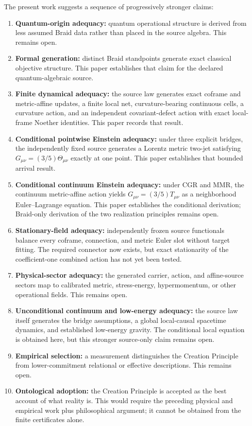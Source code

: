 \documentclass[11pt]{article}
\theoremstyle{definition}
\theoremstyle{remark}
\begin{document}
The present work suggests a sequence of progressively stronger claims:
\begin{enumerate}
\item \textbf{Quantum-origin adequacy:} quantum operational structure is derived from less assumed Braid data rather than placed in the source algebra. This remains open.
\item \textbf{Formal generation:} distinct Braid standpoints generate exact classical objective structure. This paper establishes that claim for the declared quantum-algebraic source.
\item \textbf{Finite dynamical adequacy:} the source law generates exact coframe and metric-affine updates, a finite local net, curvature-bearing continuous cells, a curvature action, and an independent covariant-defect action with exact local-frame Noether identities. This paper records that result.
\item \textbf{Conditional pointwise Einstein adequacy:} under three explicit bridges, the independently fixed source generates a Lorentz metric two-jet satisfying $G_{\mu\nu}=(3/5)\Theta_{\mu\nu}$ exactly at one point. This paper establishes that bounded arrival result.
\item \textbf{Conditional continuum Einstein adequacy:} under CGR and MMR, the continuum metric-affine action yields $G_{\mu\nu}=(3/5)T_{\mu\nu}$ as a neighborhood Euler--Lagrange equation. This paper establishes the conditional derivation; Braid-only derivation of the two realization principles remains open.
\item \textbf{Stationary-field adequacy:} independently frozen source functionals balance every coframe, connection, and metric Euler slot without target fitting. The required connector now exists, but exact stationarity of the coefficient-one combined action has not yet been tested.
\item \textbf{Physical-sector adequacy:} the generated carrier, action, and affine-source sectors map to calibrated metric, stress-energy, hypermomentum, or other operational fields. This remains open.
\item \textbf{Unconditional continuum and low-energy adequacy:} the source law itself generates the bridge assumptions, a global local-causal spacetime dynamics, and established low-energy gravity. The conditional local equation is obtained here, but this stronger source-only claim remains open.
\item \textbf{Empirical selection:} a measurement distinguishes the Creation Principle from lower-commitment relational or effective descriptions. This remains open.
\item \textbf{Ontological adoption:} the Creation Principle is accepted as the best account of what reality is. This would require the preceding physical and empirical work plus philosophical argument; it cannot be obtained from the finite certificates alone.
\end{enumerate}
\end{document}
